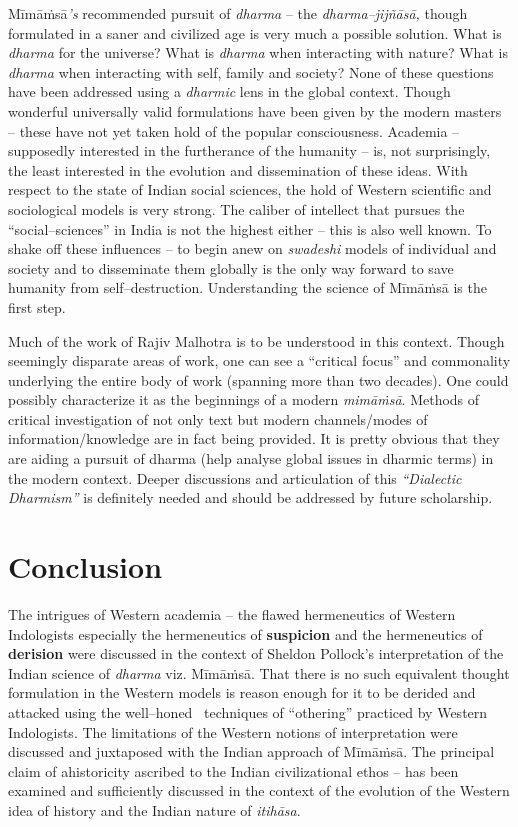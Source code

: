 Mīmāṁsā\textit{’s} recommended pursuit of \textit{dharma} – the \textit{dharma–jijñāsā,} though formulated in a saner and civilized age is very much a possible solution. What is \textit{dharma} for the universe? What is \textit{dharma} when interacting with nature? What is \textit{dharma} when interacting with self, family and society? None of these questions have been addressed using a \textit{dharmic} lens in the global context. Though wonderful universally valid formulations have been given by the modern masters – these have not yet taken hold of the popular consciousness. Academia – supposedly interested in the furtherance of the humanity – is, not surprisingly, the least interested in the evolution and dissemination of these ideas. With respect to the state of Indian social sciences, the hold of Western scientific and sociological models is very strong. The caliber of intellect that pursues the “social–sciences” in India is not the highest either – this is also well known. To shake off these influences – to begin anew on \textit{swadeshi} models of individual and society and to disseminate them globally is the only way forward to save humanity from self–destruction. Understanding the science of Mīmāṁsā is the first step.

Much of the work of Rajiv Malhotra is to be understood in this context. Though seemingly disparate areas of work, one can see a “critical focus” and commonality underlying the entire body of work (spanning more than two decades). One could possibly characterize it as the beginnings of a modern \textit{mimāṁsā}. Methods of critical investigation of not only text but modern channels/modes of information/knowledge are in fact being provided. It is pretty obvious that they are aiding a pursuit of dharma (help analyse global issues in dharmic terms) in the modern context. Deeper discussions and articulation of this \textit{“Dialectic Dharmism”} is definitely needed and should be addressed by future scholarship.


\section*{Conclusion}

The intrigues of Western academia – the flawed hermeneutics of Western Indologists especially the hermeneutics of \textbf{suspicion} and the hermeneutics of \textbf{derision} were discussed in the context of Sheldon Pollock’s interpretation of the Indian science of \textit{dharma} viz. Mīmāṁsā. That there is no such equivalent thought formulation in the Western models is reason enough for it to be derided and attacked using the well–honed  techniques of “othering” practiced by Western Indologists. The limitations of the Western notions of interpretation were discussed and juxtaposed with the Indian approach of Mīmāṁsā. The principal claim of ahistoricity ascribed to the Indian civilizational ethos – has been examined and sufficiently discussed in the context of the evolution of the Western idea of history and the Indian nature of \textit{itihāsa}.

